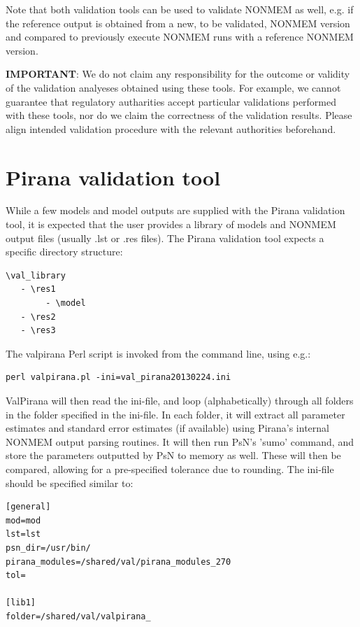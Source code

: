 {{{{\noindent Note that both validation tools can be used to validate NONMEM as
well, e.g. if the reference output is obtained from a new, to be
validated, NONMEM version and compared to previously execute NONMEM
runs with a reference NONMEM version.

\vspace{20pt}
\noindent \textbf{IMPORTANT}: We do not claim any responsibility for the outcome
or validity of the validation analyeses obtained using these
tools. For example, we cannot guarantee that regulatory autharities accept
particular validations performed with these tools, nor do we claim the correctness of the validation results.
Please align intended validation procedure with the relevant authorities beforehand.

\section{Pirana validation tool}
While a few models and model outputs are supplied with the Pirana
validation tool, it is expected that the user provides a library of
models and NONMEM output files (usually .lst or .res files). The
Pirana validation tool expects a specific directory structure:

\begin{lstlisting}
\val_library
   - \res1
        - \model
   - \res2
   - \res3
\end{lstlisting}

\noindent The valpirana Perl script is invoked from the command line, using
e.g.:

\begin{lstlisting}
perl valpirana.pl -ini=val_pirana20130224.ini
\end{lstlisting}

ValPirana will then read the ini-file, and loop (alphabetically)
through all folders in the folder specified in the ini-file. In each
folder, it will extract all parameter estimates and standard error
estimates (if available) using Pirana's internal NONMEM output parsing
routines. It will then run PsN's 'sumo' command, and store the
parameters outputted by PsN to memory as well. These will then be
compared, allowing for a pre-specified tolerance due to rounding.
The ini-file should be specified similar to:

\begin{lstlisting}
[general]
mod=mod
lst=lst
psn_dir=/usr/bin/
pirana_modules=/shared/val/pirana_modules_270
tol=

[lib1]
folder=/shared/val/valpirana_


\end{lstlisting}}}}}
